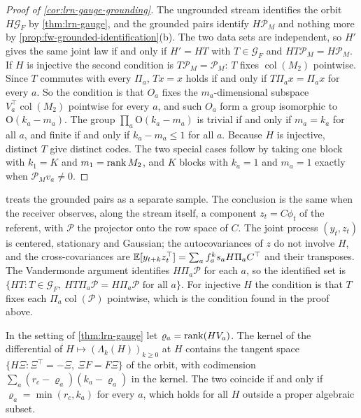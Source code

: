\begin{proof}[Proof of \cref{cor:lrn-gauge-grounding}]
The ungrounded stream identifies the orbit $H\mathcal G_F$ by \cref{thm:lrn-gauge}, and the grounded pairs identify $H\mathcal P_M$ and nothing more by \cref{prop:fw-grounded-identification}(b). The two data sets are independent, so $H'$ gives the same joint law if and only if $H'=HT$ with $T\in\mathcal G_F$ and $HT\mathcal P_M=H\mathcal P_M$. If $H$ is injective the second condition is $T\mathcal P_M=\mathcal P_M$: $T$ fixes $\operatorname{col}(M_2)$ pointwise. Since $T$ commutes with every $\Pi_a$, $Tx=x$ holds if and only if $T\Pi_ax=\Pi_ax$ for every $a$. So the condition is that $O_a$ fixes the $m_a$-dimensional subspace $V_a^\top\operatorname{col}(M_2)$ pointwise for every $a$, and such $O_a$ form a group isomorphic to $\mathrm O(k_a-m_a)$. The group $\prod_a\mathrm O(k_a-m_a)$ is trivial if and only if $m_a=k_a$ for all $a$, and finite if and only if $k_a-m_a\le1$ for all $a$. Because $H$ is injective, distinct $T$ give distinct codes. The two special cases follow by taking one block with $k_1=K$ and $m_1=\operatorname{rank} M_2$, and $K$ blocks with $k_a=1$ and $m_a=1$ exactly when $\mathcal P_Mv_a\ne0$.
\end{proof}

\begin{remark}\label{rem:lrn-gauge-same-stream}
 treats the grounded pairs as a separate sample. The conclusion is the same when the receiver observes, along the stream itself, a component $z_t=C\phi_t$ of the referent, with $\mathcal P$ the projector onto the row space of $C$. The joint process $(y_t,z_t)$ is centered, stationary and Gaussian; the autocovariances of $z$ do not involve $H$, and the cross-covariances are $\mathbb{E}[y_{t+k}z_t^\top]=\sum_af_a^ks_aH\Pi_aC^\top$ and their transposes. The Vandermonde argument identifies $H\Pi_a\mathcal P$ for each $a$, so the identified set is $\{HT:T\in\mathcal G_F,\ HT\Pi_a\mathcal P=H\Pi_a\mathcal P\text{ for all }a\}$. For injective $H$ the condition is that $T$ fixes each $\Pi_a\operatorname{col}(\mathcal P)$ pointwise, which is the condition found in the proof above.
\end{remark}

\begin{proposition}\label{prop:lrn-gauge-local}
In the setting of \cref{thm:lrn-gauge} let $\varrho_a=\operatorname{rank}(HV_a)$. The kernel of the differential of $H\mapsto(\Lambda_k(H))_{k\ge0}$ at $H$ contains the tangent space $\{H\Xi:\Xi^\top=-\Xi,\ \Xi F=F\Xi\}$ of the orbit, with codimension $\sum_a(r_c-\varrho_a)(k_a-\varrho_a)$ in the kernel. The two coincide if and only if $\varrho_a=\min(r_c,k_a)$ for every $a$, which holds for all $H$ outside a proper algebraic subset.
\end{proposition}

